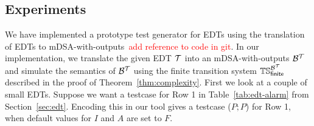 \subsection{Experiments}
\label{sec:experiments}
We have implemented a prototype test generator for EDTs using the translation of EDTs to mDSA-with-outputs~\textcolor{red}{add reference to code in git}. In our implementation, we translate the given EDT $\mathcal{T}$ into an mDSA-with-outputs $\mathcal{B}^{\mathcal{T}}$ and simulate the semantics of $\mathcal{B}^{\mathcal{T}}$ using the finite transition system $\mathbb{TS}_{\mathsf{finite}}^{\mathcal{B}^{\mathcal{T}}}$ described in the proof of Theorem~\ref{thm:complexity}.
First we look at a couple of small EDTs. Suppose we want a testcase for Row 1 in Table~\ref{tab:edt-alarm} from Section~\ref{sec:edt}. Encoding this in our tool gives a testcase ($P; P$) for Row 1, when default values for $I$ and $A$ are set to $F$.
